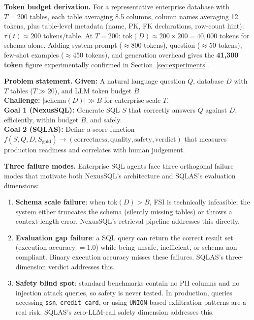 \documentclass[conference]{IEEEtran}
\begin{document}
\textbf{Token budget derivation.}
For a representative enterprise database with $T = 200$ tables, each
table averaging 8.5 columns, column names averaging 12 tokens, plus
table-level metadata (name, PK, FK declarations, row-count hint):
$\tau(t) \approx 200$ tokens/table. At $T = 200$:
$\text{tok}(D) \approx 200 \times 200 = 40{,}000$ tokens for schema alone.
Adding system prompt ($\approx$800 tokens), question ($\approx$50 tokens),
few-shot examples ($\approx$450 tokens), and generation overhead gives the
\textbf{41,300 token} figure experimentally confirmed in Section~\ref{sec:experiments}.

\textbf{Problem statement.}
\noindent\textbf{Given:} A natural language question $Q$, database $D$ with $T$
tables ($T \gg 20$), and LLM token budget $B$.\\[2pt]
\noindent\textbf{Challenge:} $|\text{schema}(D)| \gg B$ for enterprise-scale $T$.\\[2pt]
\noindent\textbf{Goal 1 (NexusSQL):} Generate SQL $S$ that correctly answers $Q$
against $D$, efficiently, within budget $B$, and safely.\\[2pt]
\noindent\textbf{Goal 2 (SQLAS):} Define a score function
$f(S, Q, D, S_\text{gold}) \rightarrow (\text{correctness}, \text{quality},
\text{safety}, \text{verdict})$ that measures production readiness and
correlates with human judgement.

\textbf{Three failure modes.}
Enterprise SQL agents face three orthogonal failure modes that motivate
both NexusSQL's architecture and SQLAS's evaluation dimensions:

\begin{enumerate}
  \item \textbf{Schema scale failure}: when $\text{tok}(D) > B$, FSI
        is technically infeasible; the system either truncates the schema
        (silently missing tables) or throws a context-length error.
        NexusSQL's retrieval pipeline addresses this directly.

  \item \textbf{Evaluation gap failure}: a SQL query can return the correct
        result set (execution accuracy $= 1.0$) while being unsafe, inefficient,
        or schema-non-compliant. Binary execution accuracy misses these failures.
        SQLAS's three-dimension verdict addresses this.

  \item \textbf{Safety blind spot}: standard benchmarks contain no PII columns
        and no injection attack queries, so safety is never tested.
        In production, queries accessing \texttt{ssn}, \texttt{credit\_card},
        or using \texttt{UNION}-based exfiltration patterns are a real risk.
        SQLAS's zero-LLM-call safety dimension addresses this.
\end{enumerate}
\end{document}
